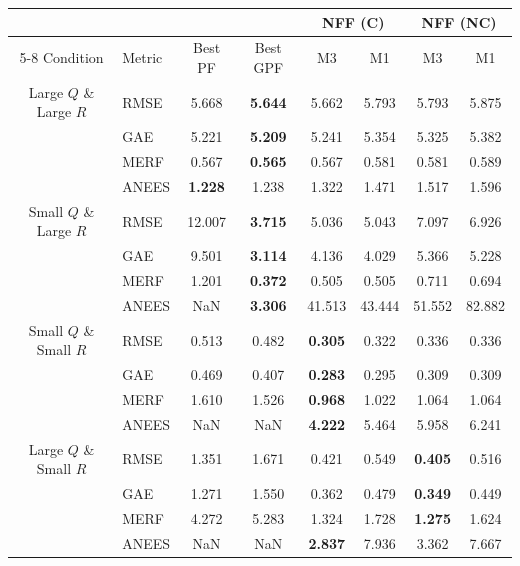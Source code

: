 \begin{Table}[ht]
	\caption{Performance under extreme combinations of $Q$ and $R$. Comparison between best PF/GPF and NFF ($L=1000$).}
	\label{tab:extreme_noise_v2}
	\footnotesize
	\setlength{\tabcolsep}{5pt}
	\begin{tabular}{|c|l|c|c|cc|cc|}
		\hline
		& & & & \multicolumn{2}{c|}{NFF (C)} & \multicolumn{2}{c|}{NFF (NC)} \\ \cline{5-8}
		Condition & Metric & Best PF & Best GPF & M3 & M1 & M3 & M1 \\ \hline
		
		{Large $Q$ \& Large $R$} 
		& RMSE  & 5.668 & \textbf{5.644} & 5.662 & 5.793 & 5.793 & 5.875 \\
		& GAE   & 5.221 & \textbf{5.209} & 5.241 & 5.354 & 5.325 & 5.382 \\
		& MERF  & 0.567 & \textbf{0.565} & 0.567 & 0.581 & 0.581 & 0.589 \\
		& ANEES & \textbf{1.228} & 1.238 & 1.322 & 1.471 & 1.517 & 1.596 \\ \hline
		
		{Small $Q$ \& Large $R$} 
		& RMSE  & 12.007 & \textbf{3.715} & 5.036 & 5.043 & 7.097 & 6.926 \\
		& GAE   & 9.501  & \textbf{3.114} & 4.136 & 4.029 & 5.366 & 5.228 \\
		& MERF  & 1.201  & \textbf{0.372} & 0.505 & 0.505 & 0.711 & 0.694 \\
		& ANEES & NaN    & \textbf{3.306} & 41.513 & 43.444 & 51.552 & 82.882 \\ \hline
		
		{Small $Q$ \& Small $R$} 
		& RMSE  & 0.513 & 0.482 & \textbf{0.305} & 0.322 & 0.336 & 0.336 \\
		& GAE   & 0.469 & 0.407 & \textbf{0.283} & 0.295 & 0.309 & 0.309 \\
		& MERF  & 1.610 & 1.526 & \textbf{0.968} & 1.022 & 1.064 & 1.064 \\
		& ANEES & NaN   & NaN   & \textbf{4.222} & 5.464 & 5.958 & 6.241 \\ \hline
		
		{Large $Q$ \& Small $R$} 
		& RMSE  & 1.351 & 1.671 & 0.421 & 0.549 & \textbf{0.405} & 0.516 \\
		& GAE   & 1.271 & 1.550 & 0.362 & 0.479 & \textbf{0.349} & 0.449 \\
		& MERF  & 4.272 & 5.283 & 1.324 & 1.728 & \textbf{1.275} & 1.624 \\
		& ANEES & NaN   & NaN   & \textbf{2.837} & 7.936 & 3.362 & 7.667 \\ \hline
	\end{tabular}
\end{Table}

\clearpage